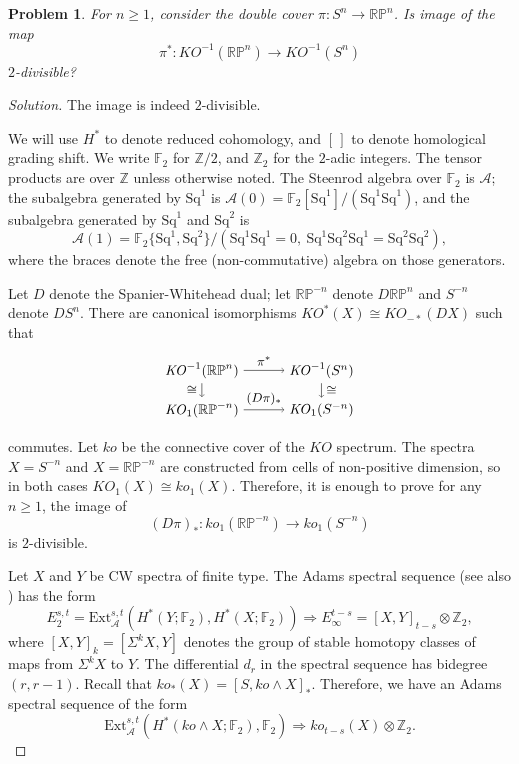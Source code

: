 \documentclass{amsart}
\newtheorem*{problem*}{Problem}
\def\Z {\mathbb{Z}}
\def\RP{\mathbb{RP}}
\def\KO{\mathit{KO}}
\def\ko{\mathit{ko}}
\newcommand{\from}{\colon}
\newcommand{\Ext}{\mathrm{Ext}}
\newcommand{\Steenrod}{\mathcal{A}}
\newcommand{\Aone}{\Steenrod(1)}
\newcommand{\Azero}{\Steenrod(0)}
\newcommand{\FF}{\mathbb{F}}
\newcommand{\ZZ}{\mathbb{Z}}
\newcommand{\smas}{\wedge}
\newcommand{\Sq}{\mathrm{Sq}}
\begin{document}
\begin{problem*}
  For $n \geq 1$, consider the double cover $\pi\from S^n \to \RP^n$. Is image of the map
  \[
  \pi^*\from \KO^{-1}(\RP^n) \to \KO^{-1}(S^n)
  \]
  $2$-divisible?
\end{problem*}


\begin{proof}[Solution]
  The image is indeed $2$-divisible.


  We will use $H^*$ to denote reduced cohomology, and $[\,]$ to denote
  homological grading shift. We write $\FF_2$ for $\ZZ/2$, and $\ZZ_2$
  for the $2$-adic integers. The tensor products are over $\Z$ unless
  otherwise noted. The Steenrod algebra over $\FF_2$ is $\Steenrod$;
  the subalgebra generated by $\Sq^1$ is
  $\Azero=\FF_2[\Sq^1]/(\Sq^1\Sq^1)$, and the subalgebra generated by
  $\Sq^1$ and $\Sq^2$ is
  \[
    \Aone = \FF_2\{\Sq^1, \Sq^2\} / (\Sq^1 \Sq^1=0, \ \Sq^1 \Sq^2 \Sq^1 = \Sq^2 \Sq^2),
  \]
  where the braces denote the free (non-commutative) algebra on those generators. 

  
  Let $D$ denote the Spanier-Whitehead dual; let $\RP^{-n}$ denote
  $D\RP^n$ and $S^{-n}$ denote $DS^n$. There are canonical
  isomorphisms $\KO^*(X)\cong \KO_{-*}(DX)$ such that
  \[
    \begin{tikzpicture}[xscale=3]
      \node (dr) at (0,0) {$\KO_{1}(\RP^{-n})$};
      \node (ds) at (1,0) {$\KO_{1}(S^{-n})$};
      \node (r) at (0,1) {$\KO^{-1}(\RP^n)$};
      \node (s) at (1,1) {$\KO^{-1}(S^n)$};
      
      \draw[->] (dr) -- (ds) node[pos=0.5, anchor=south] {\small $(D\pi)_*$};
      \draw[->] (r) -- (s) node[pos=0.5, anchor=south] {\small $\pi^*$};
      \draw[->] (r) -- (dr) node[pos=0.5,anchor=east] {\small $\cong$};
      \draw[->] (s) -- (ds) node[pos=0.5,anchor=west] {\small $\cong$};
    \end{tikzpicture}
  \]
  commutes.  Let $ko$ be the connective cover of the $\KO$
  spectrum. The spectra $X = S^{-n}$ and $X=\RP^{-n}$ are constructed
  from cells of non-positive dimension, so in both cases
  $\KO_1(X) \cong ko_1(X)$. Therefore, it is enough to prove for any
  $n\geq 1$, the image of
  \begin{equation}\label{eq:dual-main}
    (D\pi)_*\from ko_1(\RP^{-n}) \to ko_1(S^{-n})
  \end{equation}
  is $2$-divisible.


  
Let $X$ and $Y$ be CW spectra of finite type.
The Adams spectral sequence \cite{Adams, Brinkmann} (see also \cite{RognesNotes})
has the form
\begin{equation}
  E_2^{s, t}=\Ext^{s,t}_\Steenrod(H^*(Y;\FF_2),H^*(X;\FF_2))\Rightarrow   E_{\infty}^{t-s} = [X, Y]_{t-s} \otimes \ZZ_2,
\end{equation}
where $[X, Y]_k = [\Sigma^k X, Y]$ denotes the group of stable
homotopy classes of maps from $\Sigma^k X$ to $Y$. The differential
$d_r$ in the spectral sequence has bidegree $(r, r-1)$. Recall that
$ko_*(X)=[S,\ko \smas X]_*$. Therefore, we have an Adams spectral
sequence of the form
\[
\Ext^{s,t}_\Steenrod(H^*(\ko \smas X;\FF_2),\FF_2)\Rightarrow ko_{t-s}(X) \otimes \ZZ_2.
\]
 

\end{proof}
\end{document}
